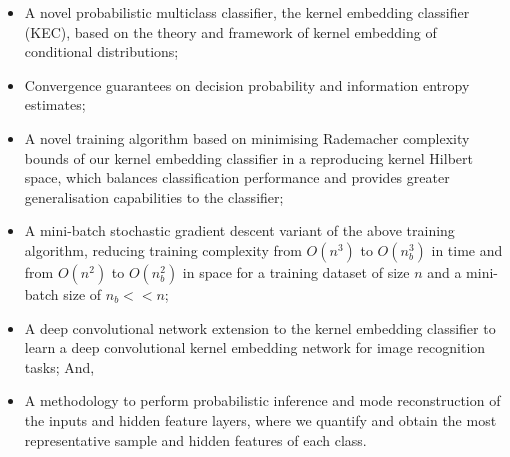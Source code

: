 \documentclass{article}
\begin{document}
	\begin{itemize}
		\item A novel probabilistic multiclass classifier, the kernel embedding classifier (KEC), based on the theory and framework of kernel embedding of conditional distributions;
		\item Convergence guarantees on decision probability and information entropy estimates;
		\item A novel training algorithm based on minimising Rademacher complexity bounds of our kernel embedding classifier in a reproducing kernel Hilbert space, which balances classification performance and provides greater generalisation capabilities to the classifier;
		\item A mini-batch stochastic gradient descent variant of the above training algorithm, reducing training complexity from $O(n^{3})$ to $O(n_{b}^{3})$ in time and from $O(n^{2})$ to $O(n_{b}^{2})$ in space for a training dataset of size $n$ and a mini-batch size of $n_{b} << n$;
		\item A deep convolutional network extension to the kernel embedding classifier to learn a deep convolutional kernel embedding network for image recognition tasks; And,
		\item A methodology to perform probabilistic inference and mode reconstruction of the inputs and hidden feature layers, where we quantify and obtain the most representative sample and hidden features of each class.
	\end{itemize}
	
\end{document}
